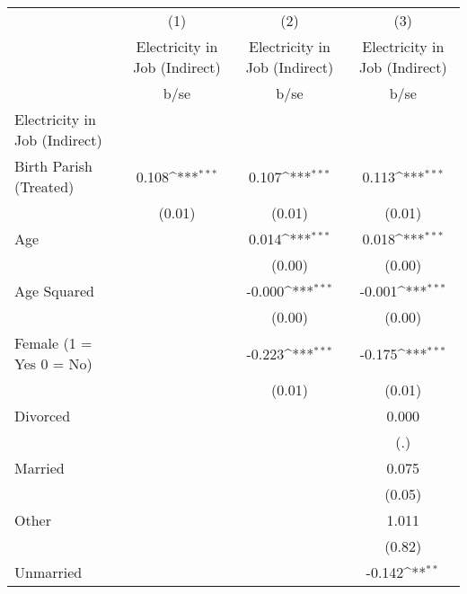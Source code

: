 {
\def\sym#1{\ifmmode^{#1}\else\(^{#1}\)\fi}
\begin{tabular}{l*{3}{c}}
\hline\hline
                    &\multicolumn{1}{c}{(1)}&\multicolumn{1}{c}{(2)}&\multicolumn{1}{c}{(3)}\\
                    &\multicolumn{1}{c}{Electricity in Job (Indirect)}&\multicolumn{1}{c}{Electricity in Job (Indirect)}&\multicolumn{1}{c}{Electricity in Job (Indirect)}\\
                    &        b/se         &        b/se         &        b/se         \\
\hline
Electricity in Job (Indirect)&                     &                     &                     \\
Birth Parish (Treated)&       0.108\sym{***}&       0.107\sym{***}&       0.113\sym{***}\\
                    &      (0.01)         &      (0.01)         &      (0.01)         \\
Age                 &                     &       0.014\sym{***}&       0.018\sym{***}\\
                    &                     &      (0.00)         &      (0.00)         \\
Age Squared         &                     &      -0.000\sym{***}&      -0.001\sym{***}\\
                    &                     &      (0.00)         &      (0.00)         \\
Female (1 = Yes 0 = No)&                     &      -0.223\sym{***}&      -0.175\sym{***}\\
                    &                     &      (0.01)         &      (0.01)         \\
Divorced            &                     &                     &       0.000         \\
                    &                     &                     &         (.)         \\
Married             &                     &                     &       0.075         \\
                    &                     &                     &      (0.05)         \\
Other               &                     &                     &       1.011         \\
                    &                     &                     &      (0.82)         \\
Unmarried           &                     &                     &      -0.142\sym{**} \\

\end{tabular}}
